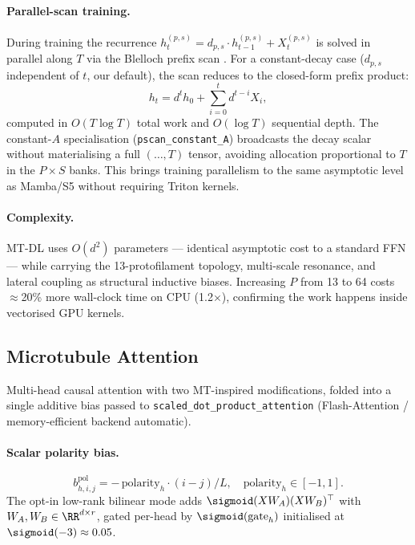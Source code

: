 \paragraph{Parallel-scan training.}
During training the recurrence $h_t^{(p,s)} = d_{p,s}\cdot h_{t-1}^{(p,s)} + X_t^{(p,s)}$ is solved in parallel along $T$ via the Blelloch prefix scan \citep{blelloch1990prefix}. For a constant-decay case ($d_{p,s}$ independent of $t$, our default), the scan reduces to the closed-form prefix product:
\begin{equation}
  h_t = d^t h_0 + \sum_{i=0}^{t} d^{t-i} X_i,
  \label{eq:pscan}
\end{equation}
computed in $O(T\log T)$ total work and $O(\log T)$ sequential depth. The constant-$A$ specialisation (\texttt{pscan\_constant\_A}) broadcasts the decay scalar without materialising a full $({\ldots}, T)$ tensor, avoiding allocation proportional to $T$ in the $P{\times}S$ banks. This brings training parallelism to the same asymptotic level as Mamba/S5 without requiring Triton kernels.

\paragraph{Complexity.}
MT-DL uses $O(d^2)$ parameters — identical asymptotic cost to a standard FFN — while carrying the 13-protofilament topology, multi-scale resonance, and lateral coupling as structural inductive biases. Increasing $P$ from 13 to 64 costs $\approx$20\% more wall-clock time on CPU (1.2$\times$), confirming the work happens inside vectorised GPU kernels.

\subsection{Microtubule Attention}
\label{sec:attn}

Multi-head causal attention with two MT-inspired modifications, folded into a single additive bias passed to \texttt{scaled\_dot\_product\_attention} (Flash-Attention / memory-efficient backend automatic).

\paragraph{Scalar polarity bias.}
\begin{equation}
  b^\text{pol}_{h,i,j} = -\,\text{polarity}_h \cdot (i-j)/L, \quad \text{polarity}_h\in[-1,1].
\end{equation}
The opt-in low-rank bilinear mode adds $\sigmoid(XW_A)(XW_B)^\top$ with $W_A,W_B\in\RR^{d\times r}$, gated per-head by $\sigmoid(\text{gate}_h)$ initialised at $\sigmoid(-3)\approx 0.05$.

